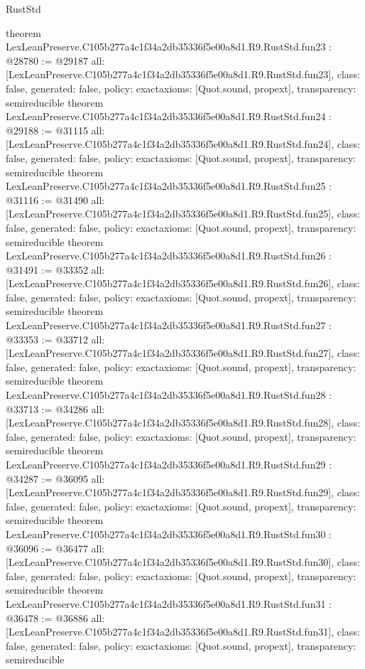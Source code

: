 \begin{lexlean}{RustStd}
\begin{coremodule}
{}
theorem LexLeanPreserve.C105b277a4c1f34a2db35336f5e00a8d1.R9.RustStd.fun23 : @28780 := @29187 {
  all: [LexLeanPreserve.C105b277a4c1f34a2db35336f5e00a8d1.R9.RustStd.fun23],
  class: false,
  generated: false,
  policy: exact{axioms: [Quot.sound, propext]},
  transparency: semireducible
}
theorem LexLeanPreserve.C105b277a4c1f34a2db35336f5e00a8d1.R9.RustStd.fun24 : @29188 := @31115 {
  all: [LexLeanPreserve.C105b277a4c1f34a2db35336f5e00a8d1.R9.RustStd.fun24],
  class: false,
  generated: false,
  policy: exact{axioms: [Quot.sound, propext]},
  transparency: semireducible
}
theorem LexLeanPreserve.C105b277a4c1f34a2db35336f5e00a8d1.R9.RustStd.fun25 : @31116 := @31490 {
  all: [LexLeanPreserve.C105b277a4c1f34a2db35336f5e00a8d1.R9.RustStd.fun25],
  class: false,
  generated: false,
  policy: exact{axioms: [Quot.sound, propext]},
  transparency: semireducible
}
theorem LexLeanPreserve.C105b277a4c1f34a2db35336f5e00a8d1.R9.RustStd.fun26 : @31491 := @33352 {
  all: [LexLeanPreserve.C105b277a4c1f34a2db35336f5e00a8d1.R9.RustStd.fun26],
  class: false,
  generated: false,
  policy: exact{axioms: [Quot.sound, propext]},
  transparency: semireducible
}
theorem LexLeanPreserve.C105b277a4c1f34a2db35336f5e00a8d1.R9.RustStd.fun27 : @33353 := @33712 {
  all: [LexLeanPreserve.C105b277a4c1f34a2db35336f5e00a8d1.R9.RustStd.fun27],
  class: false,
  generated: false,
  policy: exact{axioms: [Quot.sound, propext]},
  transparency: semireducible
}
theorem LexLeanPreserve.C105b277a4c1f34a2db35336f5e00a8d1.R9.RustStd.fun28 : @33713 := @34286 {
  all: [LexLeanPreserve.C105b277a4c1f34a2db35336f5e00a8d1.R9.RustStd.fun28],
  class: false,
  generated: false,
  policy: exact{axioms: [Quot.sound, propext]},
  transparency: semireducible
}
theorem LexLeanPreserve.C105b277a4c1f34a2db35336f5e00a8d1.R9.RustStd.fun29 : @34287 := @36095 {
  all: [LexLeanPreserve.C105b277a4c1f34a2db35336f5e00a8d1.R9.RustStd.fun29],
  class: false,
  generated: false,
  policy: exact{axioms: [Quot.sound, propext]},
  transparency: semireducible
}
theorem LexLeanPreserve.C105b277a4c1f34a2db35336f5e00a8d1.R9.RustStd.fun30 : @36096 := @36477 {
  all: [LexLeanPreserve.C105b277a4c1f34a2db35336f5e00a8d1.R9.RustStd.fun30],
  class: false,
  generated: false,
  policy: exact{axioms: [Quot.sound, propext]},
  transparency: semireducible
}
theorem LexLeanPreserve.C105b277a4c1f34a2db35336f5e00a8d1.R9.RustStd.fun31 : @36478 := @36886 {
  all: [LexLeanPreserve.C105b277a4c1f34a2db35336f5e00a8d1.R9.RustStd.fun31],
  class: false,
  generated: false,
  policy: exact{axioms: [Quot.sound, propext]},
  transparency: semireducible
}
\end{coremodule}
\end{lexlean}
